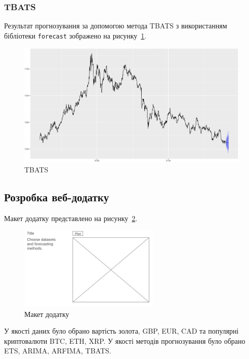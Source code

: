 \subsubsection{TBATS}
Результат прогнозування за допомогою метода TBATS з використанням бібліотеки \texttt{forecast} зображено на рисунку~\ref{fig:out_tbats}.  

\begin{figure}[H]
    \centering
        \includegraphics[width=1\textwidth]{out_tbats}
    \caption{TBATS}
    \label{fig:out_tbats}
\end{figure} 

\subsection{Розробка веб-додатку}
Макет додатку представлено на рисунку~\ref{fig:app_mockup}.\\[0.3em]

\begin{figure}[H]
    \centering
        \includegraphics[width=0.6\textwidth]{app_mockup}
    \caption{Макет додатку}
    \label{fig:app_mockup}
\end{figure} 

У якості даних було обрано вартість золота, GBP, EUR, CAD та популярні криптовалюти BTC, ETH, XRP. 
У якості методів прогнозування було обрано ETS, ARIMA, ARFIMA, TBATS.

